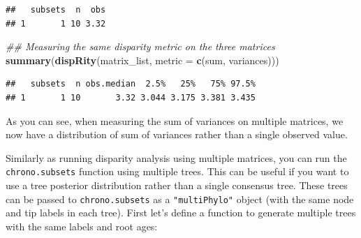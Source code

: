 \documentclass[
]{book}
\newenvironment{Shaded}{\begin{snugshade}}{\end{snugshade}}
\newcommand{\CommentTok}[1]{\textcolor[rgb]{0.56,0.35,0.01}{\textit{#1}}}
\newcommand{\DataTypeTok}[1]{\textcolor[rgb]{0.13,0.29,0.53}{#1}}
\newcommand{\KeywordTok}[1]{\textcolor[rgb]{0.13,0.29,0.53}{\textbf{#1}}}
\newcommand{\NormalTok}[1]{#1}
\begin{document}
\begin{verbatim}
##   subsets  n  obs
## 1       1 10 3.32
\end{verbatim}

\begin{Shaded}
\begin{Highlighting}[]
\CommentTok{\#\# Measuring the same disparity metric on the three matrices}
\KeywordTok{summary}\NormalTok{(}\KeywordTok{dispRity}\NormalTok{(matrix\_list, }\DataTypeTok{metric =} \KeywordTok{c}\NormalTok{(sum, variances)))}
\end{Highlighting}
\end{Shaded}

\begin{verbatim}
##   subsets  n obs.median  2.5%   25%   75% 97.5%
## 1       1 10       3.32 3.044 3.175 3.381 3.435
\end{verbatim}

As you can see, when measuring the sum of variances on multiple matrices, we now have a distribution of sum of variances rather than a single observed value.

Similarly as running disparity analysis using multiple matrices, you can run the \texttt{chrono.subsets} function using multiple trees.
This can be useful if you want to use a tree posterior distribution rather than a single consensus tree.
These trees can be passed to \texttt{chrono.subsets} as a \texttt{"multiPhylo"} object (with the same node and tip labels in each tree).
First let's define a function to generate multiple trees with the same labels and root ages:
\end{document}
